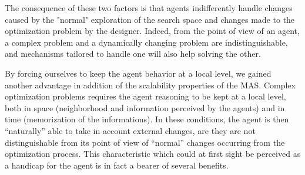 The consequence of these two factors is that agents indifferently handle changes caused by the "normal" exploration of the search space and changes made to the optimization problem by the designer. Indeed, from the point of view of an agent, a complex problem and a dynamically changing problem are indistinguishable, and mechanisms tailored to handle one will also help solving the other.

By forcing ourselves to keep the agent behavior at a local level, we gained another advantage in addition of the scalability properties of the MAS. Complex optimization problems requires the agent reasoning to be kept at a local level, both in space (neighborhood and information perceived by the agents) and in time (memorization of the informations). In these conditions, the agent is then \enquote{naturally} able to take in account external changes, are they are not distinguishable from its point of view of \enquote{normal} changes occurring from the optimization process. This characteristic which could at first sight be perceived as a handicap for the agent is in fact a bearer of several benefits.
